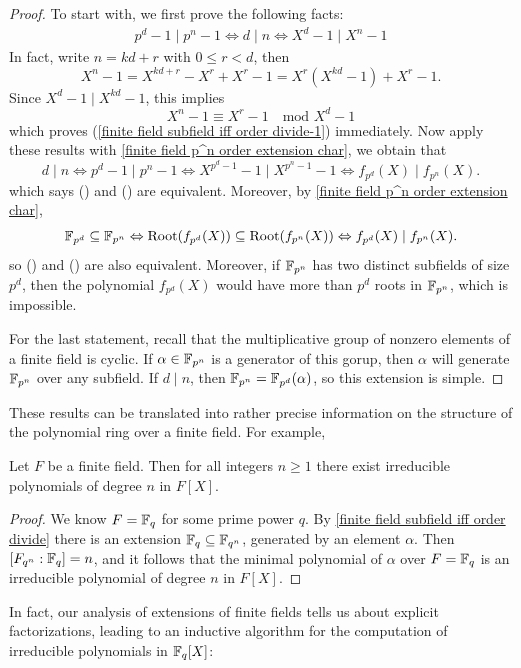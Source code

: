 \begin{proof}
To start with, we first prove the following facts:
\begin{align}\label{finite field subfield iff order divide-1}
p^d-1\mid p^n-1\Leftrightarrow d\mid n\Leftrightarrow X^d-1\mid X^n-1
\end{align}
In fact, write $n=kd+r$ with $0\leq r<d$, then
\[X^{n}-1=X^{kd+r}-X^r+X^r-1=X^r(X^{kd}-1)+X^r-1.\]
Since $X^d-1\mid X^{kd}-1$, this implies
\[X^n-1\equiv X^r-1\quad \text{mod $X^d-1$}\]
which proves (\ref{finite field subfield iff order divide-1}) immediately. Now apply these results with \cref{finite field p^n order extension char}, we obtain that
\[d\mid n\Leftrightarrow p^d-1\mid p^n-1\Leftrightarrow X^{p^d-1}-1\mid X^{p^n-1}-1\Leftrightarrow f_{p^d}(X)\mid f_{p^n}(X).\]
which says () and () are equivalent. Moreover, by \cref{finite field p^n order extension char},
\[\mathbb{F}_{p^d}\subseteq\mathbb{F}_{p^n}\Leftrightarrow\text{Root}(f_{p^d}(X))\subseteq\text{Root}(f_{p^n}(X))\Leftrightarrow f_{p^d}(X)\mid f_{p^n}(X).\]
so () and () are also equivalent. Moreover, if $\mathbb{F}_{p^n}$ has two distinct subfields of size $p^d$, then the polynomial $f_{p^d}(X)$ would have more than $p^d$ roots in $\mathbb{F}_{p^n}$, which is impossible.\par
For the last statement, recall that the multiplicative group of nonzero elements of a finite field is cyclic. If $\alpha\in\mathbb{F}_{p^n}$ is a generator of this gorup, then $\alpha$ will generate $\mathbb{F}_{p^n}$ over any subfield. If $d\mid n$, then $\mathbb{F}_{p^n}=\mathbb{F}_{p^d}(\alpha)$, so this extension is simple.
\end{proof}
These results can be translated into rather precise information on the structure of the polynomial ring over a finite field. For example,
\begin{corollary}\label{finite field irre poly of any order}
Let $F$ be a finite field. Then for all integers $n\geq1$ there exist irreducible polynomials of degree $n$ in $F[X]$.
\end{corollary}
\begin{proof}
We know $F=\mathbb{F}_{q}$ for some prime power $q$. By \cref{finite field subfield iff order divide} there is an extension $\mathbb{F}_{q}\subseteq\mathbb{F}_{q^{n}}$, generated by an element $\alpha$. Then $[F_{q^{n}}:\mathbb{F}_{q}]=n$, and it follows that the minimal polynomial of $\alpha$ over $F=\mathbb{F}_{q}$ is an irreducible polynomial of degree $n$ in $F[X]$.
\end{proof}
In fact, our analysis of extensions of finite fields tells us about explicit factorizations, leading to an inductive algorithm for the computation of irreducible polynomials in $\mathbb{F}_q[X]$:
